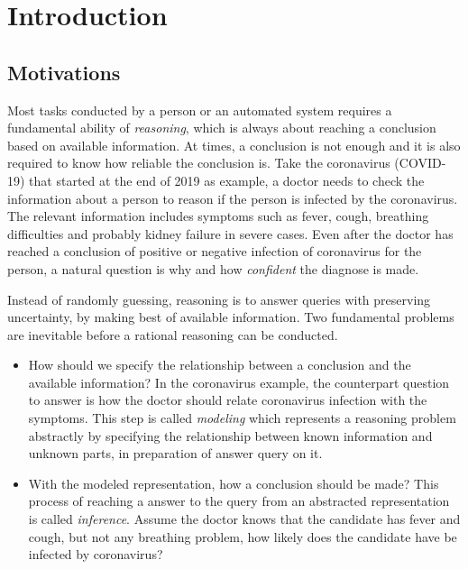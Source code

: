 \chapter{Introduction}
\label{chapter1}

\section{Motivations}
\label{section1.1}

Most tasks conducted by a person or an automated system requires a fundamental ability of \textit{reasoning}, which is always about reaching a conclusion based on available information. At times, a conclusion is not enough and it is also required to know how reliable the conclusion is. Take the coronavirus (COVID-19) that started at the end of 2019 as example, a doctor needs to check the information about a person to reason if the person is infected by the coronavirus. The relevant information includes symptoms such as fever, cough, breathing difficulties and probably kidney failure in severe cases. Even after the doctor has reached a conclusion of positive or negative infection of coronavirus for the person, a natural question is why and how \textit{confident} the diagnose is made.

Instead of randomly guessing, reasoning is to answer queries with preserving uncertainty, by making best of available information. Two fundamental problems are inevitable before a rational reasoning can be conducted. 
\begin{itemize}
\item How should we specify the relationship between a conclusion and the available information? In the coronavirus example, the counterpart question to answer is how the doctor should relate coronavirus infection with the symptoms. This step is called \textit{modeling} which represents a reasoning problem abstractly by specifying the relationship between known information and unknown parts, in preparation of answer query on it.
\item With the modeled representation, how a conclusion should be made? This process of reaching a answer to the query from an abstracted representation is called \textit{inference}. Assume the doctor knows that the candidate has fever and cough, but not any breathing problem, how likely does the candidate have be infected by coronavirus?
\end{itemize}

